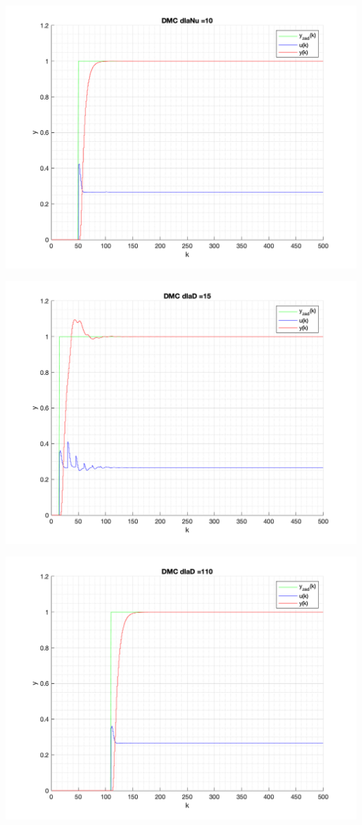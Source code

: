 \documentclass[a4paper, 11pt]{article}
\begin{document}
\begin{enumerate}
 \includegraphics[width=\linewidth]{./ModelsP4_Nu/P4_DMC_Nu_10_png.png} 
 
 \includegraphics[width=\linewidth]{./ModelsP4_D/P4_DMC_D_15_png.png} 
 
 \includegraphics[width=\linewidth]{./ModelsP4_D/P4_DMC_D_110_png.png} 
 

\end{enumerate}
\end{document}
